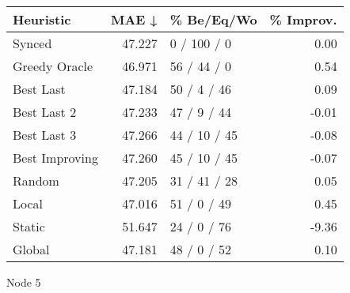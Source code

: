 \begin{tabular}{lrlr}
\toprule
\textbf{Heuristic} & \textbf{MAE ↓} & \textbf{\% Be/Eq/Wo} & \textbf{\% Improv.} \\
\midrule
            Synced &         47.227 &          0 / 100 / 0 &                0.00 \\
     Greedy Oracle &         46.971 &          56 / 44 / 0 &                0.54 \\
         Best Last &         47.184 &          50 / 4 / 46 &                0.09 \\
       Best Last 2 &         47.233 &          47 / 9 / 44 &               -0.01 \\
       Best Last 3 &         47.266 &         44 / 10 / 45 &               -0.08 \\
    Best Improving &         47.260 &         45 / 10 / 45 &               -0.07 \\
            Random &         47.205 &         31 / 41 / 28 &                0.05 \\
             Local &         47.016 &          51 / 0 / 49 &                0.45 \\
            Static &         51.647 &          24 / 0 / 76 &               -9.36 \\
            Global &         47.181 &          48 / 0 / 52 &                0.10 \\
\bottomrule
\end{tabular}
\caption{Node 5}
\label{tab:iid_lr01_le2_bs4_5}
